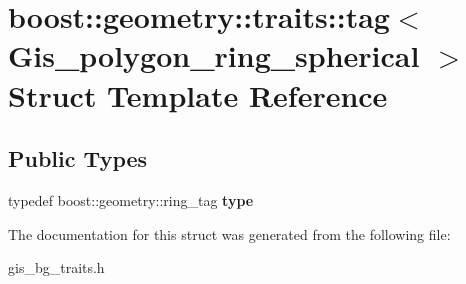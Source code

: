 \hypertarget{structboost_1_1geometry_1_1traits_1_1tag_3_01Gis__polygon__ring__spherical_01_4}{}\section{boost\+:\+:geometry\+:\+:traits\+:\+:tag$<$ Gis\+\_\+polygon\+\_\+ring\+\_\+spherical $>$ Struct Template Reference}
\label{structboost_1_1geometry_1_1traits_1_1tag_3_01Gis__polygon__ring__spherical_01_4}
\subsection*{Public Types}
\begin{DoxyCompactItemize}
\item 
\mbox{\label{structboost_1_1geometry_1_1traits_1_1tag_3_01Gis__polygon__ring__spherical_01_4_ac7c5a394378dfdc2af4e486be6a3034f}} 
typedef boost\+::geometry\+::ring\+\_\+tag {\bfseries type}
\end{DoxyCompactItemize}


The documentation for this struct was generated from the following file\+:\begin{DoxyCompactItemize}
\item 
gis\+\_\+bg\+\_\+traits.\+h\end{DoxyCompactItemize}
